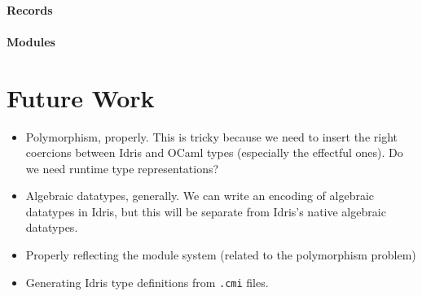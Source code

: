 \documentclass[a4paper,twocolumn]{article}
\begin{document}
\paragraph{Records}

\paragraph{Modules}

\section{Future Work}

\begin{itemize}
\item Polymorphism, properly. This is tricky because we need to insert
  the right coercions between Idris and OCaml types (especially the
  effectful ones). Do we need runtime type representations?
\item Algebraic datatypes, generally. We can write an encoding of
  algebraic datatypes in Idris, but this will be separate from Idris's
  native algebraic datatypes.
\item Properly reflecting the module system (related to the
  polymorphism problem)
\item Generating Idris type definitions from \texttt{.cmi} files.
\end{itemize}
\end{document}
